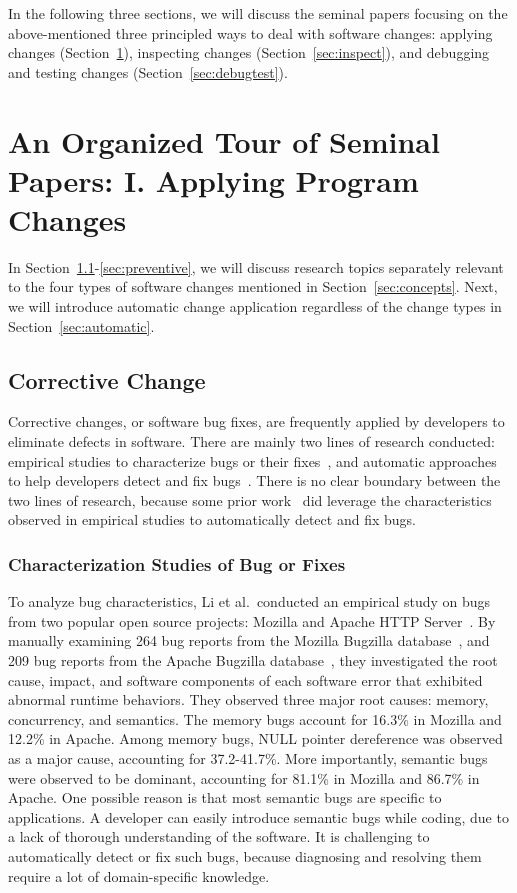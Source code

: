 \documentclass[runningheads,a4paper]{llncs}
\begin{document}
In the following three sections, we will discuss the seminal papers focusing on the above-mentioned three principled ways to deal with software changes: applying changes (Section~\ref{sec:apply}), inspecting changes (Section~\ref{sec:inspect}), and debugging and testing changes (Section~\ref{sec:debugtest}).  

\section{An Organized Tour of Seminal Papers: I. Applying Program Changes}
\label{sec:apply}
In Section~\ref{sec:corrective}-\ref{sec:preventive}, we will discuss research topics separately relevant to the four types of software changes mentioned in Section~\ref{sec:concepts}. Next, we will introduce automatic change application regardless of the change types  in Section~\ref{sec:automatic}.

\subsection{Corrective Change}
\label{sec:corrective}
Corrective changes, or software bug fixes, are frequently applied by developers to eliminate defects in software. There are mainly two lines of research conducted: empirical studies to characterize bugs or their fixes~\cite{Fenton2000:QAF,Li2006:TCE,Kim2006:MBF,Lu2008:LMC,Nguyen2010:RBF,Yin2011:FBB,Park2012:supplementary,Zhong2015:ESR}, and automatic approaches to help developers detect and fix bugs~\cite{Engler2000:CSR,Bush2000:SAF,Hangal2002:TDS,Hovemeyer2004:FBE,Naik2006:ESR,Weimer2009:AFP}. There is no clear boundary between the two lines of research, because some prior work~\cite{Li2006:CPMiner,Pham2010:DRS,Jin2012:UDR,Kim2013:PAR} did leverage the characteristics observed in empirical studies to automatically detect and fix bugs.

\subsubsection{Characterization Studies of Bug or Fixes}
To analyze bug characteristics, Li et al.~conducted an empirical study on bugs from two popular open source projects: Mozilla and Apache HTTP Server~\cite{Li2006:TCE}. By manually examining 264 bug reports from the Mozilla Bugzilla database~\cite{mozilla}, and 209 bug reports from the Apache Bugzilla database~\cite{asf}, they investigated the root cause, impact, and software components of each software error that exhibited abnormal runtime behaviors. They observed three major root causes: memory, concurrency, and semantics. The memory bugs account for 16.3\% in Mozilla and 12.2\% in Apache. Among memory bugs, NULL pointer dereference was observed as a major cause, accounting for 37.2-41.7\%. More importantly, semantic bugs were observed to be dominant, accounting for 81.1\% in Mozilla and 86.7\% in Apache. One possible reason is that most semantic bugs are specific to applications. A developer can easily introduce semantic bugs while coding, due to a lack of thorough understanding of the software. It is challenging to automatically detect or fix such bugs, because diagnosing and resolving them require a lot of domain-specific knowledge.
\end{document}
